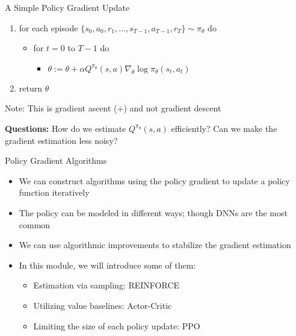 \documentclass[aspectratio=169]{../latex_main/tntbeamer}  %
\begin{document}
\begin{frame}[c]{A Simple Policy Gradient Update}
\begin{enumerate}
	\item for each episode $\{s_0, a_0, r_1, \ldots, s_{T-1}, a_{T-1}, r_T \} \sim \pi_\theta $ do
	\begin{itemize}
		\item for $t=0$ to $T - 1$ do
		\begin{itemize}
			\item $\theta := \theta + \alpha Q^{\pi_\theta}(s,a) \nabla_\theta \log \pi_\theta (s_t, a_t)  $ 
		\end{itemize}
	\end{itemize}
	\item return $\theta$
\end{enumerate}

\medskip
Note: This is gradient ascent ($+$) and not gradient descent

\pause
\medskip
\textbf{Questions:} How do we estimate $Q^{\pi_\theta}(s,a)$ efficiently? Can we make the gradient estimation less noisy?
\end{frame}
\begin{frame}[c]{Policy Gradient Algorithms}
\begin{itemize}
    \item We can construct algorithms using the policy gradient to update a policy function iteratively
    \item The policy can be modeled in different ways; though DNNs are the most common
    \item We can use algorithmic improvements to stabilize the gradient estimation
    \pause
    \item In this module, we will introduce some of them:
    \begin{itemize}
        \item Estimation via sampling: REINFORCE
        \item Utilizing value baselines: Actor-Critic
        \item Limiting the size of each policy update: PPO
    \end{itemize}
\end{itemize}
\end{frame}
\end{document}
